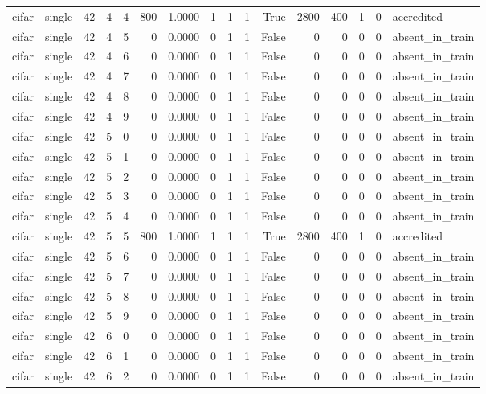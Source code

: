 \begin{tabular}{llrrrrrrrrrrrrrl}
cifar & single & 42 & 4 & 4 & 800 & 1.0000 & 1 & 1 & 1 & True & 2800 & 400 & 1 & 0 & accredited \\
cifar & single & 42 & 4 & 5 & 0 & 0.0000 & 0 & 1 & 1 & False & 0 & 0 & 0 & 0 & absent\_in\_train \\
cifar & single & 42 & 4 & 6 & 0 & 0.0000 & 0 & 1 & 1 & False & 0 & 0 & 0 & 0 & absent\_in\_train \\
cifar & single & 42 & 4 & 7 & 0 & 0.0000 & 0 & 1 & 1 & False & 0 & 0 & 0 & 0 & absent\_in\_train \\
cifar & single & 42 & 4 & 8 & 0 & 0.0000 & 0 & 1 & 1 & False & 0 & 0 & 0 & 0 & absent\_in\_train \\
cifar & single & 42 & 4 & 9 & 0 & 0.0000 & 0 & 1 & 1 & False & 0 & 0 & 0 & 0 & absent\_in\_train \\
cifar & single & 42 & 5 & 0 & 0 & 0.0000 & 0 & 1 & 1 & False & 0 & 0 & 0 & 0 & absent\_in\_train \\
cifar & single & 42 & 5 & 1 & 0 & 0.0000 & 0 & 1 & 1 & False & 0 & 0 & 0 & 0 & absent\_in\_train \\
cifar & single & 42 & 5 & 2 & 0 & 0.0000 & 0 & 1 & 1 & False & 0 & 0 & 0 & 0 & absent\_in\_train \\
cifar & single & 42 & 5 & 3 & 0 & 0.0000 & 0 & 1 & 1 & False & 0 & 0 & 0 & 0 & absent\_in\_train \\
cifar & single & 42 & 5 & 4 & 0 & 0.0000 & 0 & 1 & 1 & False & 0 & 0 & 0 & 0 & absent\_in\_train \\
cifar & single & 42 & 5 & 5 & 800 & 1.0000 & 1 & 1 & 1 & True & 2800 & 400 & 1 & 0 & accredited \\
cifar & single & 42 & 5 & 6 & 0 & 0.0000 & 0 & 1 & 1 & False & 0 & 0 & 0 & 0 & absent\_in\_train \\
cifar & single & 42 & 5 & 7 & 0 & 0.0000 & 0 & 1 & 1 & False & 0 & 0 & 0 & 0 & absent\_in\_train \\
cifar & single & 42 & 5 & 8 & 0 & 0.0000 & 0 & 1 & 1 & False & 0 & 0 & 0 & 0 & absent\_in\_train \\
cifar & single & 42 & 5 & 9 & 0 & 0.0000 & 0 & 1 & 1 & False & 0 & 0 & 0 & 0 & absent\_in\_train \\
cifar & single & 42 & 6 & 0 & 0 & 0.0000 & 0 & 1 & 1 & False & 0 & 0 & 0 & 0 & absent\_in\_train \\
cifar & single & 42 & 6 & 1 & 0 & 0.0000 & 0 & 1 & 1 & False & 0 & 0 & 0 & 0 & absent\_in\_train \\
cifar & single & 42 & 6 & 2 & 0 & 0.0000 & 0 & 1 & 1 & False & 0 & 0 & 0 & 0 & absent\_in\_train \\

\end{tabular}

